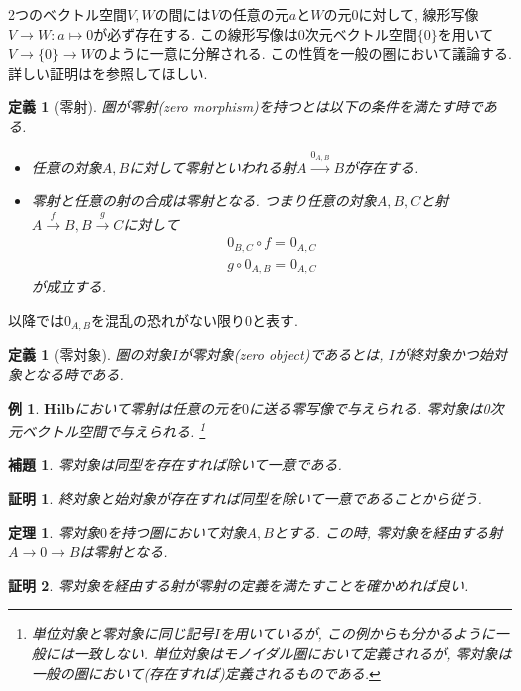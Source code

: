 \documentclass[a4paper,12pt]{ltjsarticle}
\theoremstyle{break}
\newtheorem{defn}[thm]{定義}
\newtheorem{lem}[thm]{補題}
\newtheorem{thrm}[thm]{定理}
\newtheorem{eg}[thm]{例}
\newtheorem*{prf}{証明}
\newcommand{\hilb}{\mathbf{Hilb}}
\newcommand{\xr}[1]{\xrightarrow{#1}}
\newcommand{\ci}{\circ}
\newcommand{\mt}{\mapsto}
\numberwithin{equation}{section}
\begin{document}
2つのベクトル空間$V,W$の間には$V$の任意の元$a$と$W$の元$0$に対して, 線形写像$V \to W: a\mt 0$が必ず存在する. 
この線形写像は0次元ベクトル空間$\{ 0 \}$を用いて$V \to \{0\} \to W$のように一意に分解される. 
この性質を一般の圏において議論する. 
詳しい証明は\cite{gihou}を参照してほしい. 

\begin{defn}[零射]
  圏が零射(zero morphism)を持つとは以下の条件を満たす時である. 
  \begin{itemize}
    \item 任意の対象$A,B$に対して零射といわれる射$A \xr{0_{A,B}} B$が存在する.
    \item 零射と任意の射の合成は零射となる. 
    つまり任意の対象$A,B,C$と射$A \xr{f} B, B \xr{g} C$に対して
    \begin{align*}
      0_{B,C} \ci f = 0_{A,C} \\
      g \ci 0_{A,B} = 0_{A,C}
    \end{align*}
    が成立する. 
  \end{itemize}
\end{defn}

以降では$0_{A,B}$を混乱の恐れがない限り$0$と表す. 

\begin{defn}[零対象]
  圏の対象$I$が零対象(zero object)であるとは, $I$が終対象かつ始対象となる時である. 
\end{defn}

\begin{eg}
  $\hilb$において零射は任意の元を$0$に送る零写像で与えられる. 
  零対象は0次元ベクトル空間で与えられる. 
  \footnote{
    単位対象と零対象に同じ記号$I$を用いているが, この例からも分かるように一般には一致しない. 
    単位対象はモノイダル圏において定義されるが, 零対象は一般の圏において(存在すれば)定義されるものである. 
  }
\end{eg}

\begin{lem}
  零対象は同型を存在すれば除いて一意である. 
\end{lem}

\begin{prf}
  終対象と始対象が存在すれば同型を除いて一意であることから従う. 
\end{prf}


\begin{thrm}
  零対象$0$を持つ圏において対象$A,B$とする. 
  この時, 零対象を経由する射$A \to 0 \to B$は零射となる. 
\end{thrm} 

\begin{prf}
  零対象を経由する射が零射の定義を満たすことを確かめれば良い. 
\end{prf}
\end{document}
